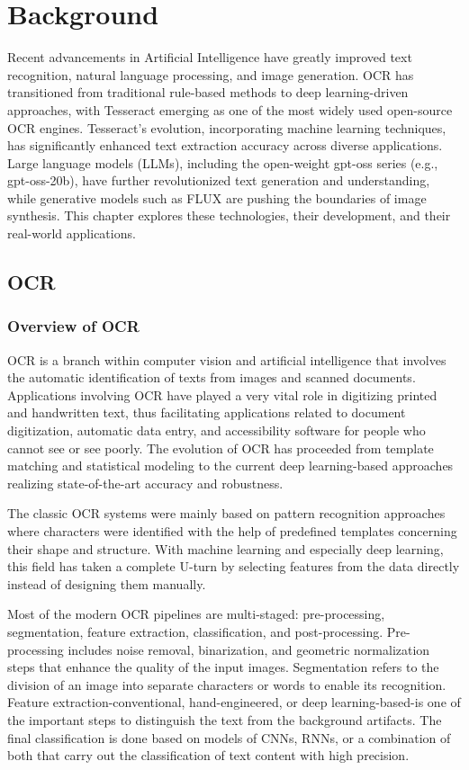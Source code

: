 \chapter{Background}

Recent advancements in Artificial Intelligence have greatly improved text recognition, natural language processing, and image generation. OCR has transitioned from traditional rule-based methods to deep learning-driven approaches, with Tesseract emerging as one of the most widely used open-source OCR engines. Tesseract’s evolution, incorporating machine learning techniques, has significantly enhanced text extraction accuracy across diverse applications. Large language models (LLMs), including the open-weight gpt-oss series (e.g., gpt-oss-20b), have further revolutionized text generation and understanding, while generative models such as FLUX are pushing the boundaries of image synthesis. This chapter explores these technologies, their development, and their real-world applications.


\section{OCR}
\subsection{Overview of OCR}
OCR is a branch within computer vision and artificial intelligence that involves the automatic identification of texts from images and scanned documents. Applications involving OCR have played a very vital role in digitizing printed and handwritten text, thus facilitating applications related to document digitization, automatic data entry, and accessibility software for people who cannot see or see poorly. The evolution of OCR has proceeded from template matching and statistical modeling to the current deep learning-based approaches realizing state-of-the-art accuracy and robustness.

The classic OCR systems were mainly based on pattern recognition approaches where characters were identified with the help of predefined templates concerning their shape and structure. With machine learning and especially deep learning, this field has taken a complete U-turn by selecting features from the data directly instead of designing them manually.

Most of the modern OCR pipelines are multi-staged: pre-processing, segmentation, feature extraction, classification, and post-processing. Pre-processing includes noise removal, binarization, and geometric normalization steps that enhance the quality of the input images. Segmentation refers to the division of an image into separate characters or words to enable its recognition. Feature extraction-conventional, hand-engineered, or deep learning-based-is one of the important steps to distinguish the text from the background artifacts. The final classification is done based on models of CNNs, RNNs, or a combination of both that carry out the classification of text content with high precision.

